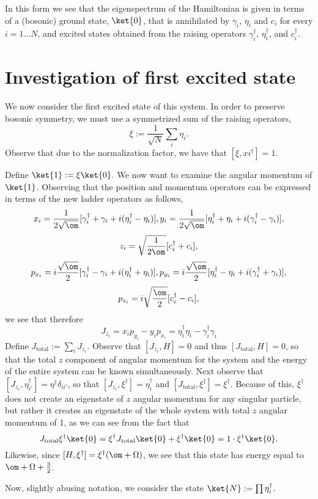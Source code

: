 \documentclass{article}
\begin{document}
In this form we see that the eigenspectrum of the Hamiltonian is given in terms of a (bosonic) ground state, $\ket{0}$, that is annihilated by $\gamma_i$, $\eta_i$ and $c_i$ for every $i=1\dots N$, and excited states obtained from the raising operators $\gamma_i^\dagger$, $\eta_i^\dagger$, and $c_i^\dagger$.

\section{Investigation of first excited state}

We now consider the first excited state of this system.  In order to preserve bosonic symmetry, we must use a symmetrized sum of the raising operators,
$$\xi := \frac{1}{\sqrt{N}}\sum_i \eta_i.$$  Observe that due to the normalization factor, we have that $[\xi,xi^\dagger] = 1$.

Define $\ket{1}:= \xi\ket{0}.$  We now want to examine the angular momentum of $\ket{1}$.  Observing that the position and momentum operators can be expressed in terms of the new ladder operators as follows,
$$
x_i = \frac{1}{2\sqrt{\om}}[\gamma_i^\dagger + \gamma_i+ i(\eta_i^\dagger-\eta_i)],
y_i = \frac{1}{2\sqrt{\om}}[\eta_i^\dagger + \eta_i+ i(\gamma_i^\dagger-\gamma_i)],
$$
$$
z_i = \sqrt{\frac{1}{2\om}}[c_i^\dagger + c_i],
$$
$$
p_{x_i} = i\frac{\sqrt{\om}}{2}[\gamma_i^\dagger - \gamma_i + i(\eta_i^\dagger + \eta_i)],
p_{y_i} =i\frac{\sqrt{\om}}{2}[\eta_i^\dagger - \eta_i + i(\gamma_i^\dagger +\gamma_i)],
$$
$$
p_{z_i} =i\sqrt{\frac{\om}{2}}[c_i^\dagger - c_i],
$$
we see that therefore
$$
J_{z_i}=x_i p_{y_i} - y_i p_{x_i} = \eta_i^\dagger\eta_i - \gamma_i^\dagger\gamma_i
$$
Define $J_{\text{total}}:=\sum_i J_{z_i}$.  Observe that $[J_{z_i},H]=0$ and thus $[J_{\text{total}},H]=0$, so that the total $z$ component of angular momentum for the system and the energy of the entire system can be known simultaneously.  Next observe that $[J_{z_i},\eta_{i'}^\dagger]=\eta^\dagger \delta_{ii'}$, so that $[J_{z_i},\xi^\dagger]=\eta_i^\dagger$ and $[J_{\text{total}},\xi^\dagger]=\xi^\dagger$.  Because of this, $\xi^\dagger$ does not create an eigenstate of $z$ angular momentum for any singular particle, but rather it creates an eigenstate of the whole system with total $z$ angular momentum of 1, as we can see from the fact that
$$J_{\text{total}} \xi^\dagger \ket{0} = \xi^\dagger J_{\text{total}} \ket{0} + \xi^\dagger \ket{0} = 1\cdot \xi^\dagger \ket{0}.$$
Likewise, since $[H,\xi^\dagger] = \xi^\dagger (\om+\Omega)$, we see that this state has energy equal to $\om+\Omega+\frac{3}{2}$.

Now, slightly abusing notation, we consider the state $\ket{N}:=\prod \eta_i^\dagger$.  
\end{document}
